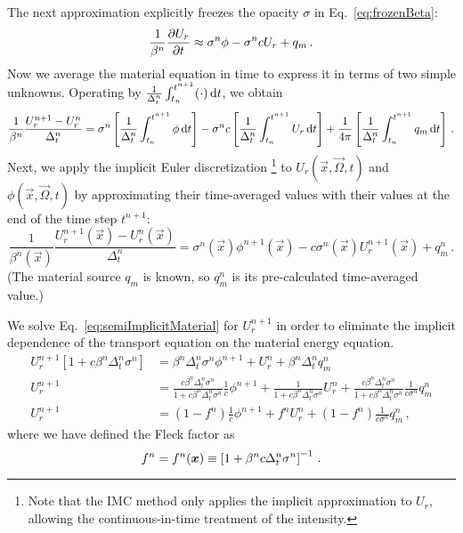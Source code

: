 The next approximation explicitly freezes the opacity $\sigma$ in
Eq.~\eqref{eq:frozenBeta}:
\begin{equation*}
  \frac{1}{\beta^n}
  \frac{\partial U_r}{\partial t} \approx \sigma^n \phi - \sigma^n c U_r + q_m \,.
\end{equation*}
Now we average the material equation in time to express it in terms of two
simple unknowns. Operating by
$\frac{1}{\Delta_t^n}\int_{t_n}^{t^{n+1}} (\cdot) \mathop{}\!\mathrm{d} t$,
we obtain
\begin{equation*}
  \frac{1}{\beta^n}
  \frac{U_r^{n+1} - U_r^n}{\Delta_t^n} = \sigma^n \left[
  \frac{1}{\Delta_t^n}\int_{t_n}^{t^{n+1}} \phi \mathop{}\!\mathrm{d} t
  \right] - \sigma^n c \left[
  \frac{1}{\Delta_t^n}\int_{t_n}^{t^{n+1}} U_r \mathop{}\!\mathrm{d} t \right]
   + \frac{1}{4\pi}\left[
  \frac{1}{\Delta_t^n}\int_{t_n}^{t^{n+1}} q_m \mathop{}\!\mathrm{d} t \right]\,.
\end{equation*}
Next, we apply the implicit Euler discretization%
\footnote{Note that the IMC method only applies the implicit approximation to
$U_r$, allowing the continuous-in-time treatment of the intensity.}
to $U_r(\vec{x}, \vec{\Omega}, t)$ and $\phi(\vec{x}, \vec{\Omega}, t)$ by
approximating their time-averaged values with their values at the end of the time
step $t^{n+1}$:
\begin{equation} \label{eq:semiImplicitMaterial}
  \frac{1}{\beta^n(\vec{x})}
  \frac{U_r^{n+1}(\vec{x}) - U_r^n(\vec{x})}{\Delta_t^n}
  = \sigma^n(\vec{x}) \phi^{n+1}(\vec{x})
  - c \sigma^n(\vec{x}) U_r^{n+1}(\vec{x}) + q_m^n \,.
\end{equation}
(The material source $q_m$ is known, so $q_m^n$ is its pre-calculated
time-averaged value.)

\thesisclearpage
We solve Eq.~\eqref{eq:semiImplicitMaterial} for $U_r^{n+1}$ in order to
eliminate the implicit dependence of the transport equation on the material
energy equation.
\begin{align} \nonumber
  U_r^{n+1} [ 1 + c \beta^n \Delta_t^n \sigma^n ]
  &= \beta^n \Delta_t^n \sigma^n\phi^{n+1} + U_r^n + \beta^n \Delta_t^n q_m^n
   \\ \nonumber
  U_r^{n+1}
  &= \frac{ c \beta^n \Delta_t^n \sigma^n }{ 1 + c \beta^n \Delta_t^n \sigma^n}
  \frac1c \phi^{n+1} + \frac1{ 1 + c \beta^n \Delta_t^n \sigma^n}
  U_r^n
  + \frac{ c \beta^n \Delta_t^n \sigma^n}{ 1 + c \beta^n \Delta_t^n \sigma^n}
  \frac1{c\sigma^n} q_m^n
  \\ \label{eq:urNPlusOne}
  U_r^{n+1}
  &= \left(1 - f^n\right) \frac1c \phi^{n+1} + f^n U_r^n
  + \left(1 - f^n\right)\frac{1}{c \sigma^n} q_m^n\,,
\end{align}
where we have defined the Fleck factor \cite{Fle1971} as
\begin{equation} \label{eq:fleckFactor}
  f^n = f^n(\bm{x}) \equiv \left[ 1 + \beta^n c \Delta_t^n \sigma^n
  \right]^{-1} \,.
\end{equation}

